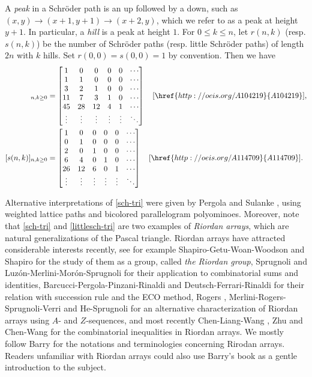 \documentclass[11pt,reqno]{amsart}
\numberwithin{equation}{section}
\theoremstyle{plain}
\theoremstyle{definition}
\begin{document}
A \emph{peak} in a Schr\"oder path is an up followed by a down, such as $(x,y)\rightarrow(x+1,y+1)\rightarrow(x+2,y)$, which we refer to as a peak at height $y+1$. In particular, a \emph{hill} is a peak at height $1$. For $0\le k\le n$, let $r(n,k)$ (resp. $s(n,k)$) be the number of Schr\"oder paths (resp. little Schr\"oder paths) of length $2n$ with $k$ hills. Set $r(0,0)=s(0,0)=1$ by convention. Then we have
\begin{align}
[r(n,k)]_{n,k\ge 0} &=
\begin{bmatrix}\label{sch-tri}
1 & 0 & 0 & 0 & 0 & \cdots\\
1 & 1 & 0 & 0 & 0 & \cdots\\
3 & 2 & 1 & 0 & 0 & \cdots\\
11 & 7 & 3 & 1 & 0 & \cdots\\
45 & 28 & 12 & 4 & 1 & \cdots\\
\vdots & \vdots & \vdots & \vdots & \vdots & \ddots
\end{bmatrix} \quad [\href{http://oeis.org/A104219}{A104219}],\\
[s(n,k)]_{n,k\ge 0} &=
\begin{bmatrix}\label{littlesch-tri}
1 & 0 & 0 & 0 & 0 & \cdots\\
0 & 1 & 0 & 0 & 0 & \cdots\\
2 & 0 & 1 & 0 & 0 & \cdots\\
6 & 4 & 0 & 1 & 0 & \cdots\\
26 & 12 & 6 & 0 & 1 & \cdots\\
\vdots & \vdots & \vdots & \vdots & \vdots & \ddots
\end{bmatrix} \quad [\href{http://oeis.org/A114709}{A114709}].
\end{align}

Alternative interpretations of \eqref{sch-tri} were given by Pergola and Sulanke \cite{PS}, using weighted lattice paths and bicolored parallelogram polyominoes. Moreover, note that \eqref{sch-tri} and \eqref{littlesch-tri} are two examples of \emph{Riordan arrays}, which are natural generalizations of the Pascal triangle. Riordan arrays have attracted considerable interests recently, see for example Shapiro-Getu-Woan-Woodson \cite{SGWW} and Shapiro \cite{Sha} for the study of them as a group, called \emph{the Riordan group}, Sprugnoli \cite{Spr} and Luz\'on-Merlini-Mor\'on-Sprugnoli \cite{LMMS} for their application to combinatorial sums and identities, Barcucci-Pergola-Pinzani-Rinaldi \cite{BPPR} and Deutsch-Ferrari-Rinaldi \cite{DFR} for their relation with succession rule and the ECO method, Rogers \cite{Rog}, Merlini-Rogers-Sprugnoli-Verri \cite{MRSV} and He-Sprugnoli \cite{HS} for an alternative characterization of Riordan arrays using $A$- and $Z$-sequences, and most recently Chen-Liang-Wang \cite{CLW}, Zhu \cite{Zhu} and Chen-Wang \cite{CW} for the combinatorial inequalities in Riordan arrays. We mostly follow Barry \cite{Bar} for the notations and terminologies concerning Rirodan arrays. Readers unfamiliar with Riordan arrays could also use Barry's book as a gentle introduction to the subject.  
\end{document}
